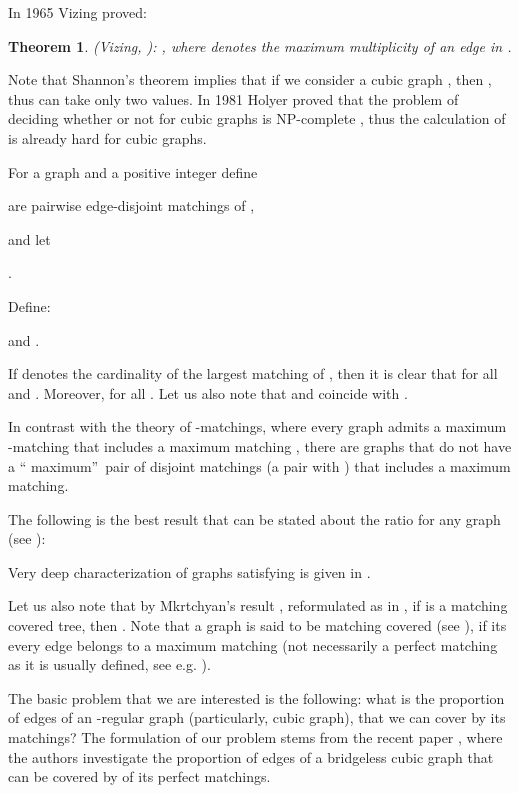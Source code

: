\documentclass[fleqn,12pt,twoside]{article}
\newtheorem{theorem}{Theorem}
\begin{document}
In 1965 Vizing proved:

\begin{theorem}
(Vizing, \cite{Vizing}): , where  denotes the maximum multiplicity of an edge in .
\end{theorem}

Note that Shannon's theorem implies that if we consider a cubic
graph , then , thus  can take
only two values. In 1981 Holyer proved that the problem of deciding whether  or not for cubic graphs  is NP-complete \cite {Holyer}, thus the calculation of  is already hard
for cubic graphs.

For a graph  and a positive integer  define

\begin{center}
 are pairwise
edge-disjoint matchings of ,
\end{center}

and let

\begin{center}
.
\end{center}

Define:

\begin{center}
  and
.
\end{center}

If  denotes the cardinality of the largest matching of ,
then it
is clear that  for all  and . Moreover,  for all . Let us also note that  and  coincide with
.

In contrast with the theory of -matchings, where every graph 
admits a maximum -matching that includes a maximum matching
\cite{Lov}, there are graphs that do not have a \textquotedblleft
maximum\textquotedblright\ pair of disjoint matchings (a pair
 with ) that includes a maximum matching.

The following is the best result that can be stated about the ratio
 for any graph  (see \cite{FiveFourth}):

Very deep characterization of graphs  satisfying  is given in \cite{FivefourthCharacter}.

Let us also note that by Mkrtchyan's result \cite{MPP0-1},
reformulated as in \cite{HararyPlummer}, if  is a matching
covered tree, then . Note that a graph is said to be matching covered (see \cite {Perfect}), if its every edge belongs to a maximum matching (not
necessarily a perfect matching as it is usually defined, see e.g.
\cite{Lov}).

The basic problem that we are interested is the following: what is
the proportion of edges of an -regular graph (particularly, cubic
graph), that we can cover by its  matchings? The formulation of
our problem stems from the recent paper \cite{KaiserKralNorine},
where the authors investigate the proportion of edges of a
bridgeless cubic graph that can be covered by  of its perfect
matchings.
\end{document}
